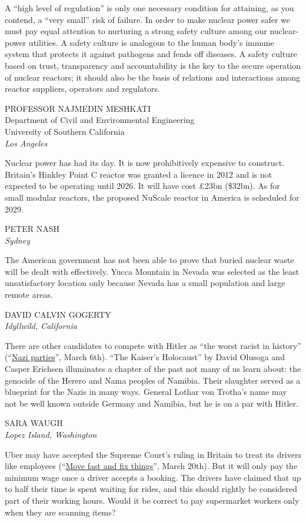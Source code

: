 \documentclass{article}
\begin{document}
A ``high level of regulation'' is only one necessary condition for attaining, as you contend, a ``very small'' risk of failure. In order to make nuclear power safer we must pay equal attention to nurturing a strong safety culture among our nuclear-power utilities. A safety culture is analogous to the human body's immune system that protects it against pathogens and fends off diseases. A safety culture based on trust, transparency and accountability is the key to the secure operation of nuclear reactors; it should also be the basis of relations and interactions among reactor suppliers, operators and regulators. 

PROFESSOR NAJMEDIN MESHKATI\\ Department of Civil and Environmental Engineering\\ University of Southern California\\ \emph{Los Angeles} 

Nuclear power has had its day. It is now prohibitively expensive to construct. Britain's Hinkley Point C reactor was granted a licence in 2012 and is not expected to be operating until 2026. It will have cost £23bn (\$32bn). As for small modular reactors, the proposed NuScale reactor in America is scheduled for 2029. 

PETER NASH\\ \emph{Sydney} 

The American government has not been able to prove that buried nuclear waste will be dealt with effectively. Yucca Mountain in Nevada was selected as the least unsatisfactory location only because Nevada has a small population and large remote areas. 

DAVID CALVIN GOGERTY\\ \emph{Idyllwild, California} 

There are other candidates to compete with Hitler as ``the worst racist in history'' (``\href{/britain/2021/03/04/a-chronicle-of-the-british-establishments-flirtation-with-hitler}{Nazi parties}'', March 6th). ``The Kaiser's Holocaust'' by David Olusoga and Casper Erichsen illuminates a chapter of the past not many of us learn about: the genocide of the Herero and Nama peoples of Namibia. Their slaughter served as a blueprint for the Nazis in many ways. General Lothar von Trotha's name may not be well known outside Germany and Namibia, but he is on a par with Hitler. 

SARA WAUGH\\ \emph{Lopez Island, Washington} 

Uber may have accepted the Supreme Court's ruling in Britain to treat its drivers like employees (``\href{/britain/2021/03/18/ubers-workers-benefit-from-a-supreme-court-decision}{Move fast and fix things}'', March 20th). But it will only pay the minimum wage once a driver accepts a booking. The drivers have claimed that up to half their time is spent waiting for rides, and this should rightly be considered part of their working hours. Would it be correct to pay supermarket workers only when they are scanning items? 
\end{document}
